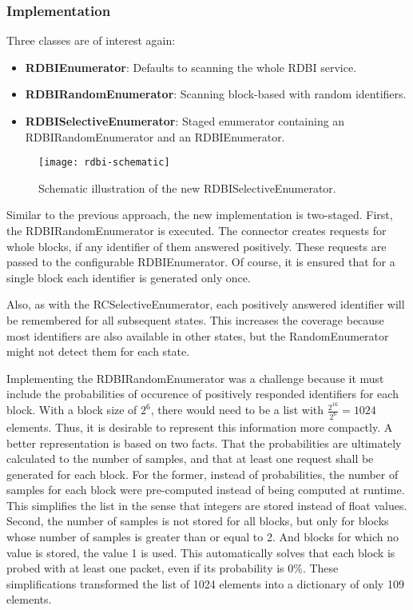 \subsubsection{Implementation}

Three classes are of interest again:

\begin{itemize}
    \item \textbf{RDBIEnumerator}: Defaults to scanning the whole RDBI service.
    \item \textbf{RDBIRandomEnumerator}: Scanning block-based with random identifiers.
    \item \textbf{RDBISelectiveEnumerator}: Staged enumerator containing an RDBIRandomEnumerator and an RDBIEnumerator.
\end{itemize}

\begin{figure}[h]
    \centering
    \texttt{[image: rdbi-schematic]}
    \caption{Schematic illustration of the new RDBISelectiveEnumerator.}
    \label{fig:rdbi-schematic}
\end{figure}

Similar to the previous approach, the new implementation is two-staged. First, the RDBIRandomEnumerator is executed. The connector creates requests for whole blocks, if any identifier of them answered positively. These requests are passed to the configurable RDBIEnumerator. Of course, it is ensured that for a single block each identifier is generated only once.

Also, as with the RCSelectiveEnumerator, each positively answered identifier will be remembered for all subsequent states. This increases the coverage because most identifiers are also available in other states, but the RandomEnumerator might not detect them for each state.

Implementing the RDBIRandomEnumerator was a challenge because it must include the probabilities of occurence of positively responded identifiers for each block. With a block size of $2^6$, there would need to be a list with $\frac{2^{16}}{2^6} = 1024$ elements. Thus, it is desirable to represent this information more compactly. A better representation is based on two facts. That the probabilities are ultimately calculated to the number of samples, and that at least one request shall be generated for each block. For the former, instead of probabilities, the number of samples for each block were pre-computed instead of being computed at runtime. This simplifies the list in the sense that integers are stored instead of float values. Second, the number of samples is not stored for all blocks, but only for blocks whose number of samples is greater than or equal to 2. And blocks for which no value is stored, the value 1 is used. This automatically solves that each block is probed with at least one packet, even if its probability is 0\%. These simplifications transformed the list of 1024 elements into a dictionary of only 109 elements.

